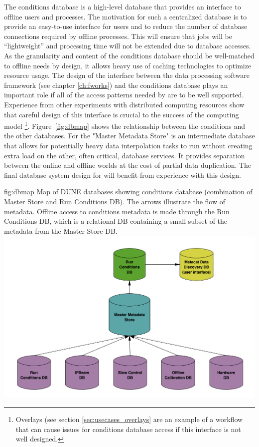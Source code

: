 \documentclass[../main-v1.tex]{subfiles}
\begin{document}
The conditions database is a high-level database that provides an interface to offline users and processes. The motivation for such a centralized database is to provide an easy-to-use interface for users and to reduce the number of database connections required by offline processes. This will ensure that jobs will be ``lightweight'' and processing time will not be extended due to database accesses. 
As the granularity and content of the conditions database should be well-matched to offline needs by design, it allows heavy use of caching technologies to optimize resource usage.  
The design of the interface between the data processing software framework (see chapter \ref{ch:fworks}) and the conditions database plays an important role if all of the access patterns needed by  are to be well supported.
Experience from other  experiments with distributed computing resources show that careful design of this interface is crucial to the success of the computing model
\footnote{Overlays (see section \ref{sec:usecases_overlays} are an example of a workflow that can cause issues for conditions database access if this interface is not well designed.}.
Figure~\ref{fig:dbmap} shows the relationship between the conditions  and the other  databases. For  the "Master Metadata Store" is an intermediate database that allows for potentially heavy data interpolation tasks to run without creating extra load on the other, often critical, database services.  It provides separation between the online and offline worlds at the cost of partial data duplication. The final database system design for  will benefit from experience with this design.


\begin{dunefigure}
{fig:dbmap} 
{Map of DUNE databases showing conditions database (combination of Master Store and Run Conditions DB). The arrows illustrate the flow of metadata. Offline access to conditions metadata is made through the Run Conditions DB, which is a relational DB containing a small subset of the metadata from the Master Store DB. }
\includegraphics[width=.9\columnwidth]{graphics/Databases/DBSystem-cartoon.png}
\end{dunefigure}
\end{document}
